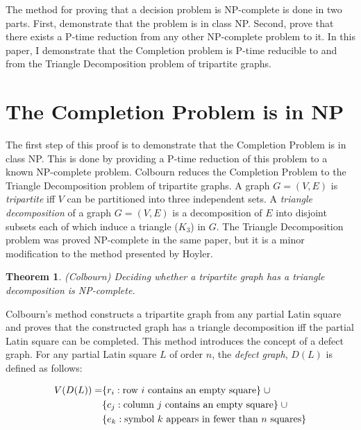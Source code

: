 \documentclass[12pt]{article}
\newtheorem{theorem}{Theorem}[section]
\theoremstyle{definition}
\theoremstyle{remark}
\begin{document}
The method for proving that a decision problem is NP-complete is done in two parts. First, demonstrate that the problem is in class NP. Second, prove that there exists a P-time reduction from any other NP-complete problem to it. In this paper, I demonstrate that the Completion problem is P-time reducible to and from the Triangle Decomposition problem of tripartite graphs. 


\section{The Completion Problem is in NP}

The first step of this proof is to demonstrate that the Completion Problem is in class NP. This is done by providing a P-time reduction of this problem to a known NP-complete problem. Colbourn\cite{colbourn} reduces the Completion Problem to the Triangle Decomposition problem of tripartite graphs. A graph $G=(V,E)$ is \textit{tripartite} iff $V$ can be partitioned into three independent sets. A \textit{triangle decomposition} of a graph $G=(V,E)$ is a decomposition of $E$ into disjoint subsets each of which induce a triangle ($K_3$) in $G$. The Triangle Decomposition problem was proved NP-complete in the same paper, but it is a minor modification to the method presented by Hoyler\cite{hoyler}.

\begin{theorem}{\textnormal{(Colbourn\cite{colbourn})}}
	Deciding whether a tripartite graph has a triangle decomposition is NP-complete.
\end{theorem}

Colbourn's method constructs a tripartite graph from any partial Latin square and proves that the constructed graph has a triangle decomposition iff the partial Latin square can be completed. This method introduces the concept of a defect graph. For any partial Latin square $L$ of order $n$, the \textit{defect graph}, $D(L)$ is defined as follows:
 
\begin{align*}
	V(D(L)) = &\{ r_i : \textnormal{row } i \textnormal{ contains an empty square} \} \; \cup \\
 &\{ c_j : \textnormal{column } j \textnormal{ contains an empty square} \} \; \cup \\
 &\{ e_k : \textnormal{symbol } k \textnormal{ appears in fewer than } n \textnormal{ squares} \}
\end{align*}
\end{document}
